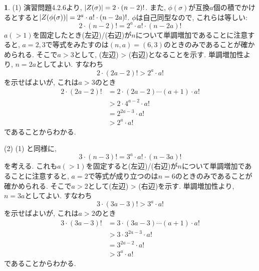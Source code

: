 \documentclass{article}
\theoremstyle{definition}
\newtheorem{ans}{}
\numberwithin{ans}{subsection}
\DeclarePairedDelimiter{\order}{\lvert}{\rvert}
\begin{document}
\begin{ans}
  (1) 演習問題4.2.6より, $\order{Z(\sigma)} = 2 \cdot (n - 2)!$.
  また, $\phi(\sigma)$が互換$a$個の積でかけるとすると$\order{Z(\phi(\sigma))} = 2^a \cdot a! \cdot (n - 2a)!$.
  $\phi$は自己同型なので, これらは等しい:
  \[
    2 \cdot (n - 2)! = 2^a \cdot a! \cdot (n - 2a)!
  \]
  $a (> 1)$を固定したとき(左辺)/(右辺)が$n$について単調増加であることに注意すると,
  $a = 2, 3$で等式をみたすのは$(n, a) = (6, 3)$のときのみであることが確かめられる.
  そこで$a > 3$として, (左辺) > (右辺)となることを示す.
  単調増加性より, $n = 2a$としてよい. すなわち
  \[
    2 \cdot (2a - 2)! > 2^a \cdot a!
  \]
  を示せばよいが, これは$a > 3$のとき
  \begin{align*}
    2 \cdot (2a - 2)! &= 2 \cdot (2a - 2) \cdots (a + 1) \cdot a! \\
    &> 2 \cdot 4^{a - 2} \cdot a! \\
    &= 2^{2a-3} \cdot a! \\
    &> 2^a \cdot a!
  \end{align*}
  であることからわかる.

  (2) (1) と同様に,
  \[
    3 \cdot (n - 3)! = 3^a \cdot a! \cdot (n - 3a)!
  \]
  を考える.
  これも$a (> 1)$を固定すると(左辺)/(右辺)が$n$について単調増加であることに注意すると,
  $a = 2$で等式が成り立つのは$n = 6$のときのみであることが確かめられる.
  そこで$a > 2$として(左辺) > (右辺)を示す.
  単調増加性より, $n = 3a$としてよい. すなわち
  \[
    3 \cdot (3a - 3)! > 3^a \cdot a!
  \]
  を示せばよいが, これは$a > 2$のとき
  \begin{align*}
    3 \cdot (3a - 3)! &= 3 \cdot (3a - 3) \cdots (a + 1) \cdot a! \\
    &> 3 \cdot 3^{2a - 3} \cdot a! \\
    &= 3^{2a - 2} \cdot a! \\
    &> 3^a \cdot a!
  \end{align*}
  であることからわかる.


\end{ans}
\end{document}
